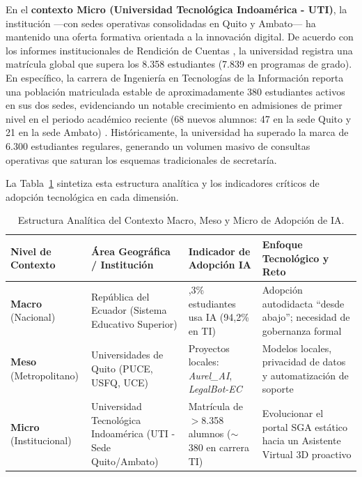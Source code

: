 En el \textbf{contexto Micro (Universidad Tecnológica Indoamérica - UTI)}, la institución —con sedes operativas consolidadas en Quito y Ambato— ha mantenido una oferta formativa orientada a la innovación digital. De acuerdo con los informes institucionales de Rendición de Cuentas \cite{uti2025rc}, la universidad registra una matrícula global que supera los 8.358 estudiantes (7.839 en programas de grado). En específico, la carrera de Ingeniería en Tecnologías de la Información reporta una población matriculada estable de aproximadamente 380 estudiantes activos en sus dos sedes, evidenciando un notable crecimiento en admisiones de primer nivel en el periodo académico reciente (68 nuevos alumnos: 47 en la sede Quito y 21 en la sede Ambato) \cite{uti2025rc}. Históricamente, la universidad ha superado la marca de 6.300 estudiantes regulares, generando un volumen masivo de consultas operativas que saturan los esquemas tradicionales de secretaría.

La Tabla~\ref{tab:contexto_macro_meso_micro} sintetiza esta estructura analítica y los indicadores críticos de adopción tecnológica en cada dimensión.

\begin{table}[h]
  \caption{Estructura Analítica del Contexto Macro, Meso y Micro de Adopción de IA.}
  \label{tab:contexto_macro_meso_micro}
\centering
\small
\setlength{\tabcolsep}{4pt}
\renewcommand{\arraystretch}{1.25}
\begin{tabular}{|>{\raggedright\arraybackslash}p{2.5cm}|>{\raggedright\arraybackslash}p{3.8cm}|>{\raggedright\arraybackslash}p{3.2cm}|>{\raggedright\arraybackslash}p{3.3cm}|}
\hline
\rowcolor[HTML]{EFEFEF}
\textbf{Nivel de Contexto} & \textbf{Área Geográfica / Institución} & \textbf{Indicador de Adopción IA} & \textbf{Enfoque Tecnológico y Reto} \\ \hline
\textbf{Macro} (Nacional) & República del Ecuador (Sistema Educativo Superior) & 87,3\% estudiantes usa IA (94,2\% en TI) \cite{ilia2024ecuador} & Adopción autodidacta ``desde abajo''; necesidad de gobernanza formal \\ \hline
\textbf{Meso} (Metropolitano) & Universidades de Quito (PUCE, USFQ, UCE) & Proyectos locales: \textit{Aurel\_AI}, \textit{LegalBot-EC} \cite{puce2024aurel} & Modelos locales, privacidad de datos y automatización de soporte \\ \hline
\textbf{Micro} (Institucional) & Universidad Tecnológica Indoamérica (UTI - Sede Quito/Ambato) & Matrícula de $>$8.358 alumnos ($\sim$380 en carrera TI) \cite{uti2025rc} & Evolucionar el portal SGA estático hacia un Asistente Virtual 3D proactivo \\ \hline
\end{tabular}
\elaboradopor{\autorTFG}
\end{table}

